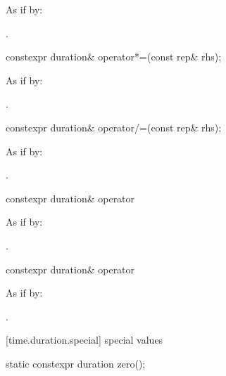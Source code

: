 \begin{itemdescr}
\pnum
\effects As if by: 

\pnum
\returns {}.
\end{itemdescr}

%
\begin{itemdecl}
constexpr duration& operator*=(const rep& rhs);
\end{itemdecl}

\begin{itemdescr}
\pnum
\effects As if by: 

\pnum
\returns {}.
\end{itemdescr}

%
\begin{itemdecl}
constexpr duration& operator/=(const rep& rhs);
\end{itemdecl}

\begin{itemdescr}
\pnum
\effects As if by: 

\pnum
\returns {}.
\end{itemdescr}

%
\begin{itemdecl}
constexpr duration& operator%
\end{itemdecl}

\begin{itemdescr}
\pnum
\effects As if by: 

\pnum
\returns {}.
\end{itemdescr}

%
\begin{itemdecl}
constexpr duration& operator%
\end{itemdecl}

\begin{itemdescr}
\pnum
\effects As if by: 

\pnum
\returns {}.
\end{itemdescr}


[time.duration.special]{ special values}

%
\begin{itemdecl}
static constexpr duration zero();
\end{itemdecl}

